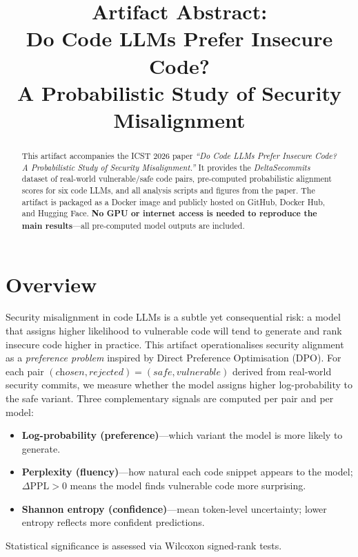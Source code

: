 \documentclass[conference]{IEEEtran}
\title{Artifact Abstract: \\
       Do Code LLMs Prefer Insecure Code?\\
       A Probabilistic Study of Security Misalignment}
\author{
  \IEEEauthorblockN{Rui Melo, Sofia Reis, Andre Catarino, Rui Abreu}
}
\begin{document}
\maketitle

\begin{abstract}
This artifact accompanies the ICST 2026 paper \emph{``Do Code LLMs Prefer
Insecure Code? A Probabilistic Study of Security Misalignment.''}
It provides the \emph{DeltaSecommits} dataset of real-world vulnerable/safe
code pairs, pre-computed probabilistic alignment scores for six code LLMs,
and all analysis scripts and figures from the paper.
The artifact is packaged as a Docker image and publicly hosted on GitHub,
Docker Hub, and Hugging Face. \textbf{No GPU or internet access is needed
to reproduce the main results}---all pre-computed model outputs are included.
\end{abstract}

\vspace{0.5cm}
\section{Overview}

Security misalignment in code LLMs is a subtle yet consequential risk: a model
that assigns higher likelihood to vulnerable code will tend to generate and rank
insecure code higher in practice. This artifact operationalises security
alignment as a \emph{preference problem} inspired by Direct Preference
Optimisation (DPO). For each pair
$(\textit{chosen}, \textit{rejected}) = (\textit{safe}, \textit{vulnerable})$
derived from real-world security commits, we measure whether the model assigns
higher log-probability to the safe variant. Three complementary signals are
computed per pair and per model:

\begin{itemize}
  \item \textbf{Log-probability (preference)}---which variant the model is more
        likely to generate.
  \item \textbf{Perplexity (fluency)}---how natural each code snippet appears
        to the model; $\Delta\text{PPL} > 0$ means the model finds vulnerable
        code more surprising.
  \item \textbf{Shannon entropy (confidence)}---mean token-level uncertainty;
        lower entropy reflects more confident predictions.
\end{itemize}

\noindent Statistical significance is assessed via Wilcoxon signed-rank tests.
\end{document}
